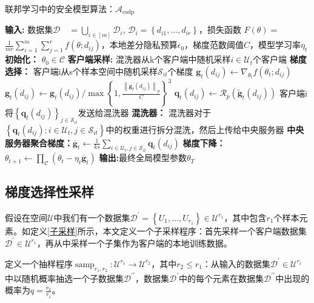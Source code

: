 \begin{algorithm}[!htb]
	\caption{联邦学习中的安全模型算法：$\mathcal{A}_{\text {csdp}}$}
	\label{联邦学习中的安全模型算法}
	\begin{algorithmic}[1]
		\footnotesize
		\STATE \textbf{输入:} 数据集$\mathcal{D} \quad=\bigcup_{i \in[m]} \mathcal{D}_{i}$, $\mathcal{D}_{i}=\left\{d_{i 1}, \ldots, d_{i r}\right\}$，损失函数 $F(\theta)=$ $\frac{1}{m r} \sum_{i=1}^{m} \sum_{j=1}^{r} f\left(\theta ; d_{i j}\right)$，本地差分隐私预算$\epsilon_{0}$，梯度范数阈值$C$，模型学习率$\eta_{t}$
		\STATE \textbf{初始化：} $\theta_{0} \in \mathcal{C}$
			\STATE \textbf{客户端采样:} 混洗器从k个客户端中随机采样$i \in \mathcal{U}_{t}$个客户端
				\STATE \textbf{梯度选择：} 客户端i从s个样本空间中随机采样$\mathcal{S}_{i t}$个梯度
					\STATE $\mathbf{g}_{t}\left(d_{i j}\right) \leftarrow \nabla_{\theta_{t}} f\left(\theta_{t} ; d_{i j}\right)$
					\STATE ${\mathbf{g}}_{t}\left(d_{i j}\right) \leftarrow \mathbf{g}_{t}\left(d_{i j}\right) / \max \left\{1, \frac{\left\|\mathbf{g}_{t}\left(d_{i j}\right)\right\|_{p}}{C}\right\}^{3}$
					\STATE $\mathbf{q}_{t}\left(d_{i j}\right) \leftarrow \mathcal{R}_{p}\left(\tilde{\mathbf{g}}_{t}\left(d_{i j}\right)\right)$
				\ENDFOR
				\STATE 客户端i将$\left\{\mathbf{q}_{t}\left(d_{i j}\right)\right\}_{j \in \mathcal{S}_{i t}}$发送给混洗器
			\ENDFOR
			\STATE \textbf{混洗器：} 混洗器对于$\left\{\boldsymbol{q}_{t}\left(d_{i j}\right): i \in \mathcal{U}_{t}, j \in \mathcal{S}_{i t}\right\}$中的权重进行拆分混洗，然后上传给中央服务器
			\STATE \textbf{中央服务器聚合梯度：}$\overline{\mathbf{g}}_{t} \leftarrow \frac{1}{k s} \sum_{i \in \mathcal{U}_{t}, j \in \mathcal{S}_{i t}} \boldsymbol{q}_{t}\left(d_{i j}\right)$
			\STATE \textbf{梯度下降：}$\theta_{t+1} \leftarrow \prod_{\mathcal{C}}\left(\theta_{t}-\eta_{t} \overline{\mathbf{g}}_{t}\right)$
		\ENDFOR
		\STATE \textbf{输出:}最终全局模型参数$\theta_{T}$

	\end{algorithmic}
\end{algorithm}

\newpage

\subsection{梯度选择性采样}
假设在空间$\mathcal{U}$中我们有一个数据集$\mathcal{D}^{\prime}=\left\{U_{1}, \ldots, U_{r_{1}}\right\} \in \mathcal{U}^{r_{1}}$，其中包含$r_{1}$个样本元素。如定义\ref{子采样}所示，本文定义一个子采样程序：首先采样一个客户端数据集$\mathcal{D}^{\prime} \in \mathcal{U}^{r_{1}}$，再从中采样一个子集作为客户端的本地训练数据。
\begin{define}[子采样]\label{子采样}
定义一个抽样程序$\operatorname{samp}_{r_{1}, r_{2}}: \mathcal{U}^{r_{1}} \rightarrow \mathcal{U}^{r_{2}}$，其中$r_{2} \leq r_{1}$：从输入的数据集$\mathcal{D}^{\prime} \in \mathcal{U}^{r_{1}}$ 中以随机概率抽选一个子数据集$\mathcal{D}^{\prime \prime}$，数据集$\mathcal{D}^{\prime}$中的每个元素在数据集$\mathcal{D}^{\prime \prime}$中出现的概率为$q=\frac{r_{2}}{r_{1}}$。
\end{define}

